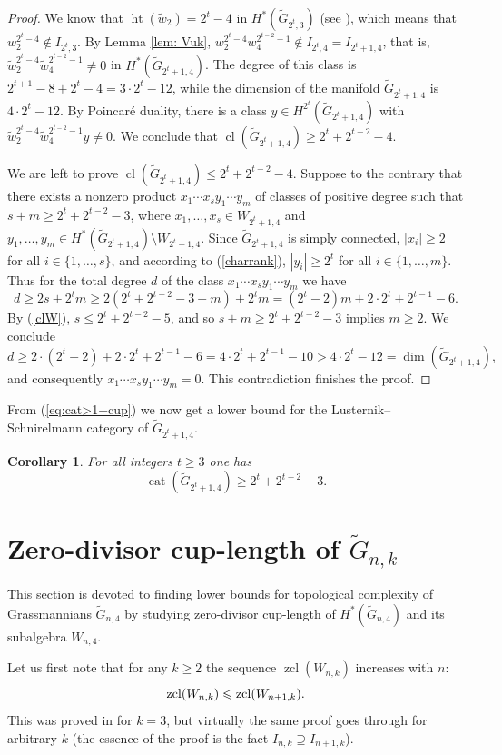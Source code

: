 \documentclass{amsart}
\newtheorem{corollary}[theorem]{Corollary}
\theoremstyle{definition}
\theoremstyle{remark}
\numberwithin{equation}{section}
\newcommand{\gr}{\widetilde G}
\newcommand{\w}{\widetilde w}
\newcommand{\htt}{\operatorname{ht}}
\newcommand{\cl}{\operatorname{cl}}
\newcommand{\zcl}{\operatorname{zcl}}
\newcommand{\cat}{\operatorname{cat}}
\renewcommand{\le}{\leqslant}
\renewcommand{\ge}{\geqslant}
\begin{document}
\begin{proof}
We know that $\htt(\w_2) = 2^t-4$ in $H^*(\gr_{2^t,3})$ (see \cite[Theorem 1.2]{CP-cl}), which means that $w_2^{2^t-4}\notin I_{2^t,3}$. By Lemma \ref{lem: Vuk}, $w_2^{2^t-4}w_4^{2^{t-2}-1}\notin I_{2^t,4}=I_{2^t+1,4}$, that is, $\w_2^{2^t-4}\w_4^{2^{t-2}-1}\neq0$ in $H^*(\gr_{2^t+1,4})$. The degree of this class is $2^{t+1}-8+2^t-4=3\cdot2^t-12$, while the dimension of the manifold $\gr_{2^t+1,4}$ is $4\cdot2^t-12$. By Poincar\'e duality, there is a class $y\in H^{2^t}(\gr_{2^t+1,4})$ with $\w_2^{2^t-4}\w_4^{2^{t-2}-1}y\neq0$. We conclude that $\cl(\gr_{2^t+1,4})\ge2^t+2^{t-2} - 4$.

We are left to prove $\cl(\gr_{2^t+1,4})\le2^t+2^{t-2} - 4$. Suppose to the contrary that there exists a nonzero product $x_1\cdots x_sy_1\cdots y_m$ of classes of positive degree such that $s+m\ge2^t+2^{t-2}-3$, where $x_1,\ldots,x_s\in W_{2^t+1,4}$ and $y_1,\ldots,y_m\in H^*(\gr_{2^t+1,4})\setminus W_{2^t+1,4}$. Since $\gr_{2^t+1,4}$ is simply connected, $|x_i|\ge2$ for all $i\in\{1,\ldots,s\}$, and according to (\ref{charrank}), $|y_i|\ge2^t$ for all $i\in\{1,\ldots,m\}$. Thus for the total degree $d$ of the class $x_1\cdots x_sy_1\cdots y_m$ we have
\[d\ge2s+2^tm\ge2(2^t+2^{t-2}-3-m)+2^tm=(2^t-2)m+2\cdot2^t+2^{t-1}-6.\]
By (\ref{clW}), $s\le2^t+2^{t-2}-5$, and so $s+m\ge2^t+2^{t-2}-3$ implies $m\ge2$. We conclude
\[d\ge2\cdot(2^t-2)+2\cdot2^t+2^{t-1}-6=4\cdot2^t+2^{t-1}-10>4\cdot2^t-12=\dim(\gr_{2^t+1,4}),\]
and consequently $x_1\cdots x_sy_1\cdots y_m=0$. This contradiction finishes the proof.
\end{proof}


From (\ref{eq:cat>1+cup}) we now get a lower bound for the Lusternik--Schnirelmann category of $\gr_{2^t+1,4}$.
\begin{corollary} For all integers $t\ge 3$ one has
    \[\cat(\gr_{2^t+1,4})\ge2^t+2^{t-2} - 3.\]
\end{corollary}




\section{Zero-divisor cup-length of $\gr_{n,k}$}
\label{sec:5}

This section is devoted to finding lower bounds for topological complexity of Grassmannians $\gr_{n,4}$ by studying zero-divisor cup-length of $H^*(\gr_{n,4})$ and its subalgebra $W_{n,4}$. 

Let us first note that for any $k\ge2$ the sequence $\zcl(W_{n,k})$ increases with $n$:
\begin{equation}\label{zcl(W_{n,k}) increases}
   \zcl(W_{n,k})\le\zcl(W_{n+1,k}).
\end{equation}
This was proved in \cite[Lemma 3.3]{CPR} for $k=3$, but virtually the same proof goes through for arbitrary $k$ (the essence of the proof is the fact $I_{n,k}\supseteq I_{n+1,k}$).
\end{document}
